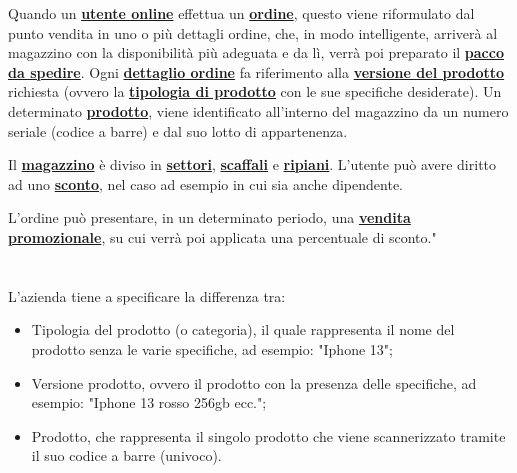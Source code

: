 Quando un \textbf{\underline{utente online}} effettua un \textbf{\underline{ordine}}, questo viene riformulato dal punto vendita in uno o più dettagli ordine, che, in modo intelligente, arriverà al magazzino con la disponibilità più adeguata e da lì, verrà poi preparato il \textbf{\underline{pacco da spedire}}.
Ogni \textbf{\underline{dettaglio ordine}} fa riferimento alla \textbf{\underline{versione del prodotto}} richiesta (ovvero la \textbf{\underline{tipologia di prodotto}} con le sue specifiche desiderate).
Un determinato \textbf{\underline{prodotto}}, viene identificato all'interno del magazzino da un numero seriale (codice a barre) e dal suo lotto di appartenenza.

Il \textbf{\underline{magazzino}} è diviso in \textbf{\underline{settori}}, \textbf{\underline{scaffali}} e \textbf{\underline{ripiani}}.
L'utente può avere diritto ad uno \textbf{\underline{sconto}}, nel caso ad esempio in cui sia anche dipendente.

L'ordine può presentare, in un determinato periodo, una \textbf{\underline{vendita promozionale}}, su cui verrà poi applicata una percentuale di sconto."
\\\\\\
L'azienda tiene a specificare la differenza tra:
\begin{itemize}
    \item Tipologia del prodotto (o categoria), il quale rappresenta il nome del prodotto senza le varie specifiche, ad esempio: "Iphone 13";
    \item Versione prodotto, ovvero il prodotto con la presenza delle specifiche, ad esempio: "Iphone 13 rosso 256gb ecc.";
    \item Prodotto, che rappresenta il singolo prodotto che viene scannerizzato tramite il suo codice a barre (univoco).
\end{itemize}
